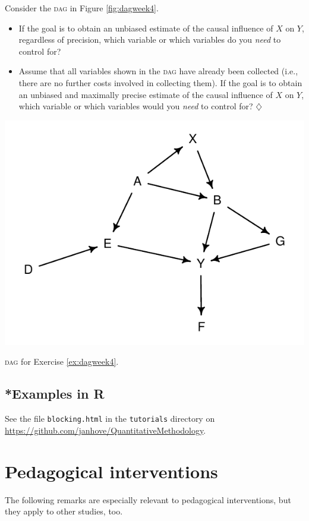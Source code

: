 \documentclass[a4paper]{tufte-book}\usepackage[]{graphicx}\usepackage[]{xcolor}
\newcommand*{\parend}[1][$\diamondsuit$]{%
\leavevmode\unskip\penalty9999 \hbox{}\nobreak\hfill
    \quad\hbox{#1}%
}
\begin{document}
 Consider the \textsc{dag} in Figure \ref{fig:dagweek4}.\label{ex:dagweek4}

  \begin{itemize}[(a)]
    \item If the goal is to obtain an unbiased estimate of the causal influence
    of $X$ on $Y$, regardless of precision, which variable or which variables do you \emph{need} to control for?

    \item Assume that all variables shown in the \textsc{dag} have already been collected
    (i.e., there are no further costs involved in collecting them).
    If the goal is to obtain an unbiased and maximally precise estimate of the causal
    influence of $X$ on $Y$,
    which variable or which variables would you \emph{need} to control for?\parend
  \end{itemize}

\begin{marginfigure}[-4.5cm]
  \includegraphics[width=\textwidth]{figure/week5_ex1}
  \caption{\textsc{dag} for Exercise \ref{ex:dagweek4}.}
  \label{fig:dagweek4}
\end{marginfigure}

\section{*Examples in R}
See the file \texttt{blocking.html} in the \texttt{tutorials} directory
on \url{https://github.com/janhove/QuantitativeMethodology}.

\chapter{Pedagogical interventions}
The following remarks are especially relevant to pedagogical interventions,
but they apply to other studies, too.
\end{document}
